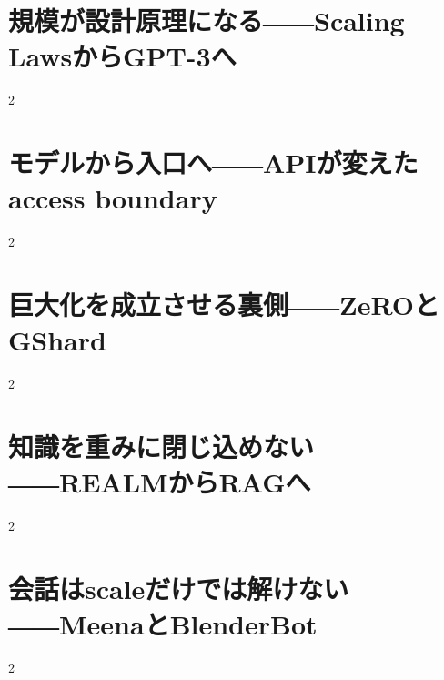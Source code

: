 \documentclass[lualatex,a4paper,11pt]{jlreq}
\begin{document}
\surveycover
\clearpage


\clearpage
\section{規模が設計原理になる――Scaling LawsからGPT-3へ}
\label{pkg:scale-laws-gpt3}

\medskip
\begin{multicols}{2}

\end{multicols}


\clearpage
\section{モデルから入口へ――APIが変えたaccess boundary}
\label{pkg:access-api}

\medskip
\begin{multicols}{2}

\end{multicols}


\clearpage
\section{巨大化を成立させる裏側――ZeROとGShard}
\label{pkg:systems-scale}

\medskip
\begin{multicols}{2}

\end{multicols}


\clearpage
\section{知識を重みに閉じ込めない――REALMからRAGへ}
\label{pkg:retrieval-grounding}

\medskip
\begin{multicols}{2}

\end{multicols}


\clearpage
\section{会話はscaleだけでは解けない――MeenaとBlenderBot}
\label{pkg:dialogue-systems}

\medskip
\begin{multicols}{2}

\end{multicols}

\end{document}
